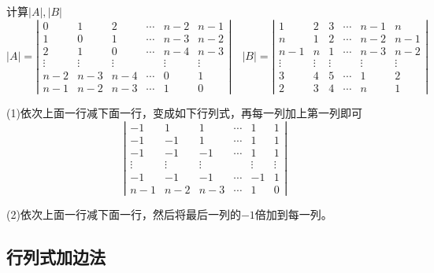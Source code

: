 \begin{exercise}[循环型]
  计算$|A|,|B|$
  \begin{equation*}
    |A| = \left|
      \begin{array}{cccccc}
        0&1&2&\cdots&n-2&n-1 \\
        1&0&1&\cdots&n-3&n-2 \\
        2&1&0&\cdots&n-4&n-3 \\
        \vdots&\vdots&\vdots&&\vdots&\vdots \\
        n-2&n-3&n-4&\cdots&0&1 \\
        n-1&n-2&n-3&\cdots&1&0
      \end{array}
    \right| \quad
    |B| = \left|
      \begin{array}{cccccc}
        1&2&3&\cdots&n-1&n \\
         n&1&2&\cdots&n-2&n-1 \\
         n-1&n&1&\cdots&n-3&n-2 \\
         \vdots&\vdots&\vdots&&\vdots&\vdots \\
         3&4&5&\cdots&1&2 \\
         2&3&4&\cdots&n&1
      \end{array}
    \right|
  \end{equation*}
\end{exercise}

\begin{solution}
  (1)依次上面一行减下面一行，变成如下行列式，再每一列加上第一列即可
  \begin{equation*}
    \left|
      \begin{array}{cccccc}
        -1&1&1&\cdots&1&1\\
        -1&-1&1&\cdots&1&1\\
        -1&-1&-1&\cdots&1&1\\ 
          \vdots&\vdots&\vdots&&\vdots&\vdots \\
        -1&-1&-1&\cdots&-1&1\\ 
        n-1&n-2&n-3&\cdots&1&0
      \end{array}
    \right|
  \end{equation*}

  (2)依次上面一行减下面一行，然后将最后一列的$-1$倍加到每一列。
\end{solution}


\subsection{行列式加边法}

